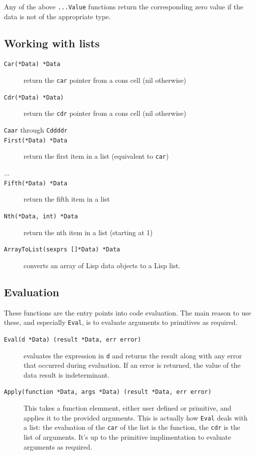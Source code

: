 \documentclass[12pt]{article}
\begin{document}
\noindent Any of the above \verb|...Value| functions return the
corresponding zero value if the data is 
not of the appropriate type.

\subsection{Working with lists}

\begin{description}
\item [{\tt Car(*Data) *Data}] return the \verb|car| pointer from a cons
  cell (nil otherwise)
\item [{\tt Cdr(*Data) *Data)}] return the \verb|cdr| pointer from a cons
  cell (nil otherwise)
\item [{\tt Caar} through {\tt Cddddr}]
\item [{\tt First(*Data) *Data}] return the first item in a list
  (equivalent to \verb|car|)
\item [...]
\item [{\tt Fifth(*Data) *Data}] return the fifth item in a list
\item [{\tt Nth(*Data, int) *Data}] return the nth item in a list
  (starting at 1)
\item [{\tt ArrayToList(sexprs []*Data) *Data}] converts an array of
  Lisp data objects to a Lisp list.
\end{description}

\subsection{Evaluation}

These functions are the entry points into code evaluation. The main
reason to use these, and especially \verb|Eval|, is to evaluate
arguments to primitives as required.

\begin{description}
\item [{\tt Eval(d *Data) (result *Data, err error)}] evaluates the
  expression in \verb|d| and returns the result along with any error
  that occurred during evaluation. If an error is returned, the value
  of the data result is indeterminant.
\item [{\tt Apply(function *Data, args *Data) (result *Data, err error)}]
  This takes a function elemment, either user defined or
  primitive, and applies it to the provided arguments. This is actually
  how \verb|Eval| deals with a list: the evaluation of the \verb|car| of the list is the
  function, the \verb|cdr| is the list of arguments. It's up to the
  primitive implimentation to evaluate arguments as required.
\end{description}
\end{document}
